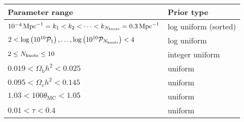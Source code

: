 \begin{tabular}{ll}
  Parameter range &
  Prior type
  \\
  \toprule
  \(10^{-4}\,\mathrm{Mpc}^{-1} = k_1< k_2 < \cdots < k_{N_\mathrm{knots}} = 0.3\,\mathrm{Mpc}^{-1}\) &
  log uniform (sorted)
  \\
  \( 2 < \log\left(10^{10}\mathcal{P}_{1}\right), \ldots ,\log\left(10^{10}\mathcal{P}_{{N_\mathrm{knots}}}\right) < 4 \)  &
  log uniform
  \\
  \(2\le N_\mathrm{knots} \le 10 \) &
  integer uniform
  \\
  \midrule
  \(0.019< \Omega_\mathrm{b} h^2 <0.025\) &
  uniform
  \\
  \(0.095< \Omega_\mathrm{c} h^2 <0.145\) &
  uniform
  \\
  \(1.03< 100\theta_\mathrm{MC} <1.05\) &
  uniform
  \\
  \(0.01< \tau< 0.4\) &
  uniform
  \\
  \bottomrule
\end{tabular}

